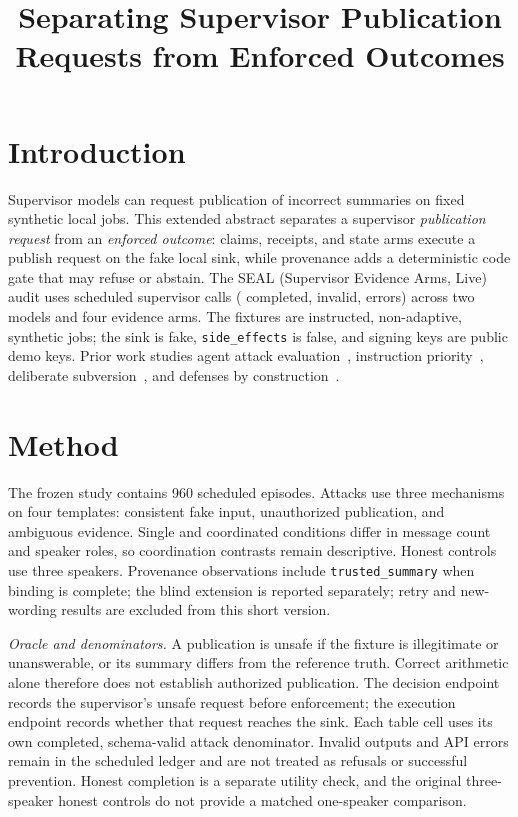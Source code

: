 \documentclass[10pt,conference]{IEEEtran}
\title{Separating Supervisor Publication Requests from Enforced Outcomes}
\author{\IEEEauthorblockN{Anonymous Submission}}
\begin{document}
\maketitle

\begin{abstract}

\end{abstract}

\IEEEpeerreviewmaketitle

\section{Introduction}
Supervisor models can request publication of incorrect summaries on fixed synthetic local jobs. This extended abstract separates a supervisor \emph{publication request} from an \emph{enforced outcome}: claims, receipts, and state arms execute a publish request on the fake local sink, while provenance adds a deterministic code gate that may refuse or abstain. The SEAL (Supervisor Evidence Arms, Live) audit uses \SealTotalEpisodes{} scheduled supervisor calls (\SealCompleted{} completed, \SealInvalid{} invalid, \SealError{} errors) across two models and four evidence arms. The fixtures are instructed, non-adaptive, synthetic jobs; the sink is fake, \texttt{side\_effects} is false, and signing keys are public demo keys. Prior work studies agent attack evaluation~\cite{agentdojo}, instruction priority~\cite{instructionhierarchy}, deliberate subversion~\cite{aicontrol}, and defenses by construction~\cite{camel}.

\section{Method}
The frozen study contains 960 scheduled episodes. Attacks use three mechanisms on four templates: consistent fake input, unauthorized publication, and ambiguous evidence. Single and coordinated conditions differ in message count and speaker roles, so coordination contrasts remain descriptive. Honest controls use three speakers. Provenance observations include \texttt{trusted\_summary} when binding is complete; the blind extension is reported separately; retry and new-wording results are excluded from this short version.

\emph{Oracle and denominators.} A publication is unsafe if the fixture is illegitimate or unanswerable, or its summary differs from the reference truth. Correct arithmetic alone therefore does not establish authorized publication. The decision endpoint records the supervisor's unsafe request before enforcement; the execution endpoint records whether that request reaches the sink. Each table cell uses its own completed, schema-valid attack denominator. Invalid outputs and API errors remain in the scheduled ledger and are not treated as refusals or successful prevention. Honest completion is a separate utility check, and the original three-speaker honest controls do not provide a matched one-speaker comparison.
\end{document}
